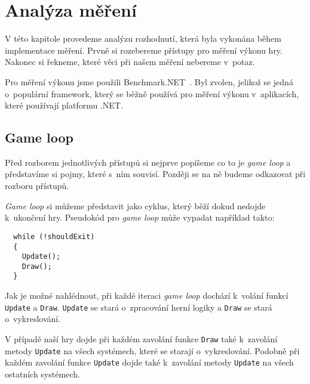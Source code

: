 

\chapter{Analýza měření}
V této kapitole provedeme analýzu rozhodnutí, která byla vykonána během implementace měření. Prvně si rozebereme přístupy pro měření výkonu hry. Nakonec si řekneme, které věci při našem měření nebereme v~potaz.

Pro měření výkonu jsme použili Benchmark.NET~\cite{BenchmarkDotNet}. Byl zvolen, jelikož se jedná o~populární framework, který se běžně používá pro měření výkonu v~aplikacích, které používají platformu .NET.

\section{Game loop}
Před rozborem jednotlivých přístupů si nejprve popíšeme co to je \textit{game loop} a představíme si pojmy, které s~ním souvisí. Později se na ně budeme odkazovat při rozboru přístupů.

\textit{Game loop} si můžeme představit jako cyklus, který běží dokud nedojde k~ukončení hry. Pseudokód pro \textit{game loop} může vypadat například takto:

\begin{verbatim}
  while (!shouldExit) 
  {
    Update();
    Draw();
  }
\end{verbatim}

Jak je možné nahlédnout, při každé iteraci \textit{game loop} dochází k~volání funkcí \texttt{Update} a  \texttt{Draw}. \texttt{Update} se stará o~zpracování herní logiky a \texttt{Draw} se stará o~vykreslování.

V případě naší hry dojde při každém zavolání funkce \texttt{Draw} také k~zavolání metody \texttt{Update} na všech systémech, které se starají o~vykreslování. Podobně při každém zavolání funkce \texttt{Update} dojde také k~zavolání metody \texttt{Update} na všech ostatních systémech.

